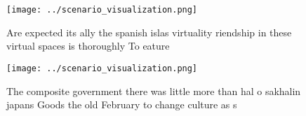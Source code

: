 \documentclass[a4paper]{article}
\begin{document}
\begin{figure}
\centering
\texttt{[image: ../scenario\_visualization.png]}
\caption{Are expected its ally the spanish islas virtuality riendship in these virtual spaces is thoroughly To eature 
}
\end{figure}
 
\begin{figure}
\centering
\texttt{[image: ../scenario\_visualization.png]}
\caption{The composite government there was little more than hal o sakhalin japans Goods the old February to change culture as s
}
\end{figure}
 
\end{document}
